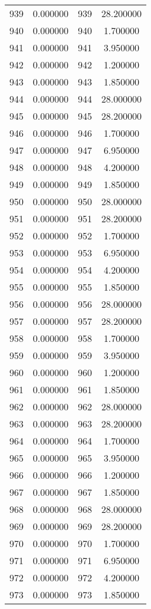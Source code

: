 \documentclass[12pt]{article}
\begin{document}
\begin{longtable}{@{}cccc@{}}
939 & 0.000000 & 939 & 28.200000 \\
940 & 0.000000 & 940 & 1.700000 \\
941 & 0.000000 & 941 & 3.950000 \\
942 & 0.000000 & 942 & 1.200000 \\
943 & 0.000000 & 943 & 1.850000 \\
944 & 0.000000 & 944 & 28.000000 \\
945 & 0.000000 & 945 & 28.200000 \\
946 & 0.000000 & 946 & 1.700000 \\
947 & 0.000000 & 947 & 6.950000 \\
948 & 0.000000 & 948 & 4.200000 \\
949 & 0.000000 & 949 & 1.850000 \\
950 & 0.000000 & 950 & 28.000000 \\
951 & 0.000000 & 951 & 28.200000 \\
952 & 0.000000 & 952 & 1.700000 \\
953 & 0.000000 & 953 & 6.950000 \\
954 & 0.000000 & 954 & 4.200000 \\
955 & 0.000000 & 955 & 1.850000 \\
956 & 0.000000 & 956 & 28.000000 \\
957 & 0.000000 & 957 & 28.200000 \\
958 & 0.000000 & 958 & 1.700000 \\
959 & 0.000000 & 959 & 3.950000 \\
960 & 0.000000 & 960 & 1.200000 \\
961 & 0.000000 & 961 & 1.850000 \\
962 & 0.000000 & 962 & 28.000000 \\
963 & 0.000000 & 963 & 28.200000 \\
964 & 0.000000 & 964 & 1.700000 \\
965 & 0.000000 & 965 & 3.950000 \\
966 & 0.000000 & 966 & 1.200000 \\
967 & 0.000000 & 967 & 1.850000 \\
968 & 0.000000 & 968 & 28.000000 \\
969 & 0.000000 & 969 & 28.200000 \\
970 & 0.000000 & 970 & 1.700000 \\
971 & 0.000000 & 971 & 6.950000 \\
972 & 0.000000 & 972 & 4.200000 \\
973 & 0.000000 & 973 & 1.850000 \\

\end{longtable}
\end{document}
